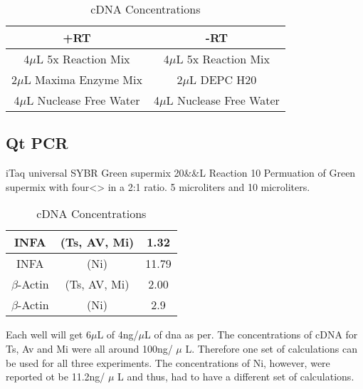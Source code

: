 \documentclass[journal, a4paper]{IEEEtran}
\begin{document}
        \begin{table}[!hbt]
          \begin{center}
          \caption{cDNA Concentrations}
          \label{tab:simParameters}
          \begin{tabular}{|c|c|}
            \hline
            +RT & -RT \\
            \hline
            4$\mu$L 5x Reaction Mix & 4$\mu$L 5x Reaction Mix \\
            \hline
            2$\mu$L Maxima Enzyme Mix & 2$\mu$L DEPC H20 \\
            \hline
            4$\mu$L Nuclease Free Water & 4$\mu$L Nuclease Free Water \\
            \hline
          \end{tabular}
          \end{center}
        \end{table}

    \subsection{Qt PCR}

      iTaq universal SYBR Green supermix 20&\mu&L Reaction
      10
      Permuation of Green supermix with four<> in a 2:1 ratio.
      5 microliters and 10 microliters.

      \begin{table}[!hbt]
        \begin{center}
        \caption{cDNA Concentrations}
        \label{tab:simParameters}
        \begin{tabular}{|c|c|c|}
          \hline
          INFA & (Ts, AV, Mi) & 1.32 \\
          \hline
          INFA & (Ni) & 11.79 \\
          \hline
          $\beta$-Actin & (Ts, AV, Mi) & 2.00 \\
          \hline
          $\beta$-Actin & (Ni) & 2.9 \\
          \hline
        \end{tabular}
        \end{center}
      \end{table}

      Each well will get 6$\mu$L of 4ng/$\mu$L of dna as per.
      The concentrations of cDNA for Ts, Av and Mi were all around 100ng/ $\mu$ L. Therefore one set of calculations can be used for all three
      experiments. The concentrations of Ni, however, were reported ot be 11.2ng/ $\mu$ L and thus, had to have a different set of calculations.
\end{document}
